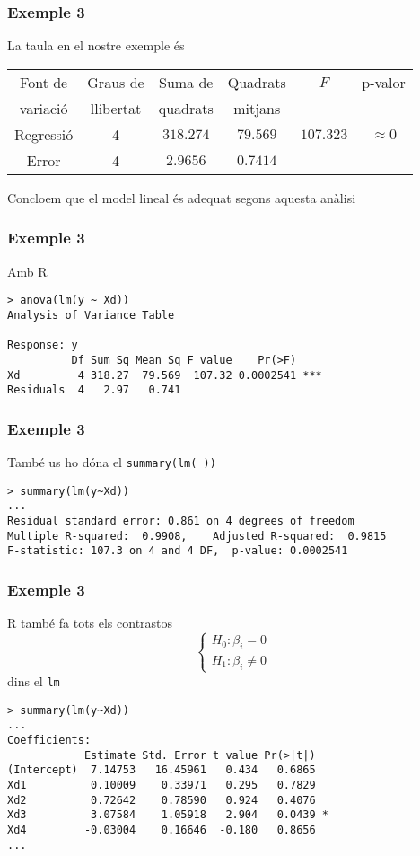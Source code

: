 \documentclass[12pt,t]{beamer}
\theoremstyle{plain}
\theoremstyle{definition}
\begin{document}
\begin{frame}
\frametitle{Exemple 3}
La taula en el nostre exemple és


\begin{center}
\footnotesize \begin{tabular}{|c|c|c|c|c|c|}\hline
Font de & Graus de & Suma de & Quadrats & $F$ & p-valor\\
variació & llibertat &  quadrats & mitjans      &  & \\\hline
Regressió & 4 & $318.274$  & $79.569$ & $107.323$ &  $\approx 0$\\
Error & 4 & $2.9656$  & $0.7414$ & &\\
\hline 
\end{tabular}
\end{center}
Concloem que el model lineal és adequat segons aquesta anàlisi
\end{frame}

\begin{frame}[fragile]
\frametitle{Exemple 3}

Amb R

{\small
\begin{verbatim}
> anova(lm(y ~ Xd))
Analysis of Variance Table

Response: y
          Df Sum Sq Mean Sq F value    Pr(>F)    
Xd         4 318.27  79.569  107.32 0.0002541 ***
Residuals  4   2.97   0.741                      
\end{verbatim}
}

\end{frame}

\begin{frame}[fragile]
\frametitle{Exemple 3}

També us ho dóna el \texttt{summary(lm( ))}
{\footnotesize
\begin{verbatim}
> summary(lm(y~Xd))
...
Residual standard error: 0.861 on 4 degrees of freedom
Multiple R-squared:  0.9908,	Adjusted R-squared:  0.9815 
F-statistic: 107.3 on 4 and 4 DF,  p-value: 0.0002541
\end{verbatim}
}

\end{frame}


\begin{frame}[fragile]
\frametitle{Exemple 3}
R també fa tots els contrastos
$$
\left\{\begin{array}{l} H_0: \beta_i=0 \\
H_1: \beta_i\neq 0 \end{array}
\right.
$$
dins el  \texttt{lm}
\medskip

{\footnotesize
\begin{verbatim}
> summary(lm(y~Xd))
...
Coefficients:
            Estimate Std. Error t value Pr(>|t|)  
(Intercept)  7.14753   16.45961   0.434   0.6865  
Xd1          0.10009    0.33971   0.295   0.7829  
Xd2          0.72642    0.78590   0.924   0.4076  
Xd3          3.07584    1.05918   2.904   0.0439 *
Xd4         -0.03004    0.16646  -0.180   0.8656  
...
\end{verbatim}
}

\end{frame}
\end{document}

